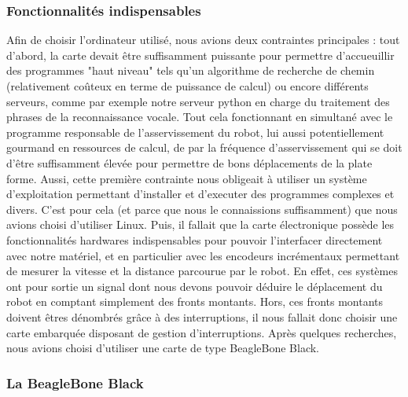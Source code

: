 \documentclass{report}
\begin{document}
     \subsubsection{Fonctionnalités indispensables}

     {Afin de choisir l'ordinateur utilisé, nous avions deux contraintes principales :
     tout d'abord, la carte devait être suffisamment puissante pour permettre
     d'accueuillir des programmes "haut niveau" tels qu'un algorithme de recherche de chemin
     (relativement coûteux en terme de puissance de calcul) ou encore différents
     serveurs, comme par exemple notre serveur python en charge du traitement des
     phrases de la reconnaissance vocale. Tout cela fonctionnant en simultané avec
     le programme responsable de l'asservissement du robot, lui aussi potentiellement
     gourmand en ressources de calcul, de par la fréquence d'asservissement qui se doit
     d'être suffisamment élevée pour permettre de bons déplacements de la plate forme.
     Aussi, cette première contrainte nous obligeait à utiliser un système d'exploitation
     permettant d'installer et d'executer des programmes complexes et divers. C'est pour
     cela (et parce que nous le connaissions suffisamment) que nous avions choisi
     d'utiliser Linux.}
     {Puis, il fallait que la carte électronique possède les fonctionnalités
     hardwares indispensables pour pouvoir l'interfacer directement avec notre matériel,
     et en particulier avec les encodeurs incrémentaux permettant de mesurer la
     vitesse et la distance parcourue par le robot. En effet, ces systèmes ont pour
     sortie un signal dont nous devons pouvoir déduire le déplacement du robot en
     comptant simplement des fronts montants. Hors, ces fronts montants
     doivent êtres dénombrés grâce à des interruptions, il nous fallait donc choisir
     une carte embarquée disposant de gestion d'interruptions. Après quelques recherches,
     nous avions choisi d'utiliser une carte de type BeagleBone Black.}

     \subsubsection{La BeagleBone Black}
\end{document}
